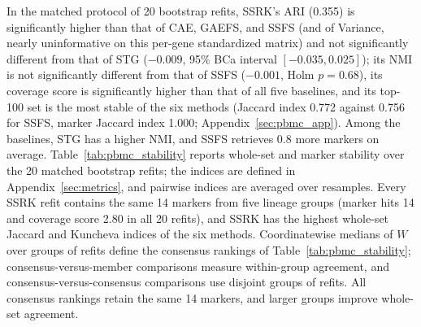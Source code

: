 In the matched protocol of 20 bootstrap refits, SSRK's ARI (0.355) is significantly higher than that of CAE, GAEFS, and SSFS (and of Variance, nearly uninformative on this per-gene standardized matrix) and not significantly different from that of STG ($-0.009$, 95\% BCa interval $[-0.035,0.025]$); its NMI is not significantly different from that of SSFS ($-0.001$, Holm $p=0.68$), its coverage score is significantly higher than that of all five baselines, and its top-100 set is the most stable of the six methods (Jaccard index 0.772 against 0.756 for SSFS, marker Jaccard index 1.000; Appendix~\ref{sec:pbmc_app}). Among the baselines, STG has a higher NMI, and SSFS retrieves 0.8 more markers on average.
Table~\ref{tab:pbmc_stability} reports whole-set and marker stability over the 20 matched bootstrap refits; the indices are defined in Appendix~\ref{sec:metrics}, and pairwise indices are averaged over resamples. Every SSRK refit contains the same 14 markers from five lineage groups (marker hits 14 and coverage score 2.80 in all 20 refits), and SSRK has the highest whole-set Jaccard and Kuncheva indices of the six methods. Coordinatewise medians of $W$ over groups of refits define the consensus rankings of Table~\ref{tab:pbmc_stability}; consensus-versus-member comparisons measure within-group agreement, and consensus-versus-consensus comparisons use disjoint groups of refits. All consensus rankings retain the same 14 markers, and larger groups improve whole-set agreement.
